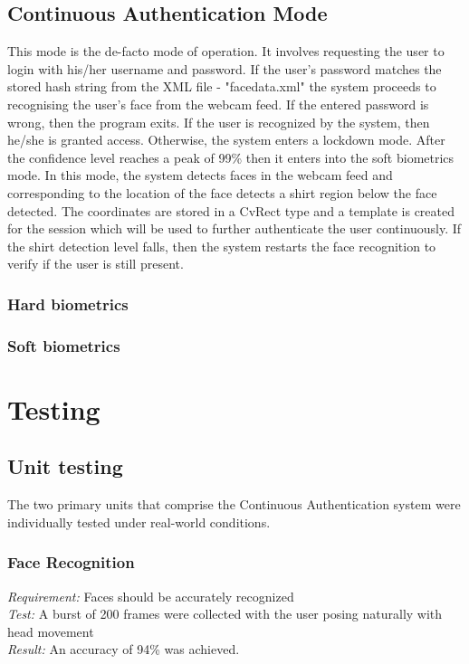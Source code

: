 \documentclass[12pt]{article}			%
\begin{document}
\subsection { Continuous Authentication Mode }
This mode is the de-facto mode of operation. It involves requesting the user to login with his/her username and password. If the user's password matches the stored hash string from the XML file - "facedata.xml" the system proceeds to recognising the user's face from the webcam feed. If the entered password is wrong, then the program exits. If the user is recognized by the system, then he/she is granted access. Otherwise, the system enters a lockdown mode. After the confidence level reaches a peak of 99\% then it enters into the soft biometrics mode. In this mode, the system detects faces in the webcam feed and corresponding to the location of the face detects a shirt region below the face detected. The coordinates are stored in a CvRect type and a template is created for the session which will be used to further authenticate the user continuously. If the shirt detection level falls, then the system restarts the face recognition to verify if the user is still present.
\subsubsection{ Hard biometrics }

\subsubsection{ Soft biometrics }

\section{ Testing }

\subsection{ Unit testing }
The two primary units that comprise the Continuous Authentication system were individually tested under real-world conditions.

\subsubsection{ Face Recognition }
\emph{ Requirement: } Faces should be accurately recognized\\
\emph{ Test: } A burst of 200 frames were collected with the user posing naturally with head movement\\
\emph{ Result: } An accuracy of 94\% was achieved.\\
\end{document}

